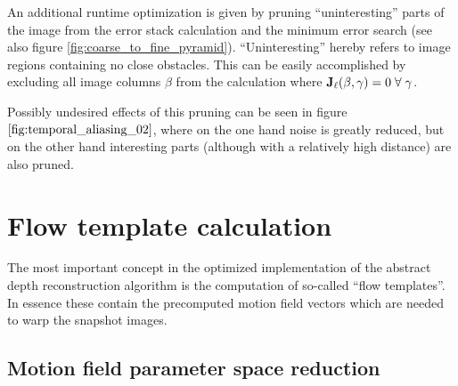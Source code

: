 An additional runtime optimization is given by pruning ``uninteresting'' parts of the image from the error stack calculation and the minimum error search (see also figure \ref{fig:coarse_to_fine_pyramid}). ``Uninteresting'' hereby refers to image regions containing no close obstacles. This can be easily accomplished by excluding all image columns $\beta$ from the calculation where $\mathbf{J}_{\ell}(\beta, \gamma) = 0 \; \forall \; \gamma$.

Possibly undesired effects of this pruning can be seen in figure $\ref{fig:temporal_aliasing_02}$, where on the one hand noise is greatly reduced, but on the other hand interesting parts (although with a relatively high distance) are also pruned.

\section{Flow template calculation}

\label{sec:flow_template_calculation}

The most important concept in the optimized implementation of the abstract depth reconstruction algorithm is the computation of so-called ``flow templates''. In essence these contain the precomputed motion field vectors which are needed to warp the snapshot images. 

\subsection{Motion field parameter space reduction}

